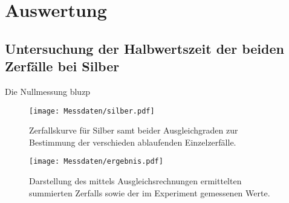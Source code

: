 \section{Auswertung}
\label{sec:Auswertung}






















\subsection{Untersuchung der Halbwertszeit der beiden Zerfälle bei Silber}
Die Nullmessung bluzp
\begin{figure}
  \centering
  \texttt{[image: Messdaten/silber.pdf]}
  \caption{Zerfallskurve für Silber samt beider Ausgleichgraden zur Bestimmung der verschieden ablaufenden Einzelzerfälle.}
  \label{fig:silber}
\end{figure}

\begin{figure}
  \centering
  \texttt{[image: Messdaten/ergebnis.pdf]}
  \caption{Darstellung des mittels Ausgleichsrechnungen ermittelten summierten Zerfalls sowie der im Experiment gemessenen Werte.}
  \label{fig:ergebnis}
\end{figure}







